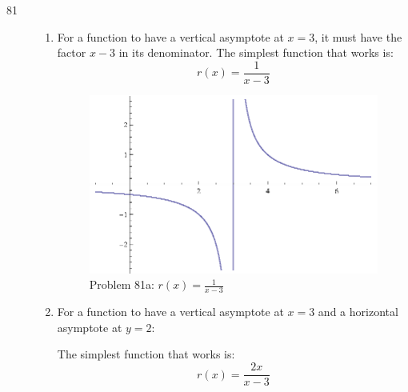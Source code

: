 \documentclass{exam}
\begin{document}
\begin{description}
    \pagebreak

    \item[81]
      \begin{enumerate}[a]
        \item 
          For a function to have a vertical asymptote at $x = 3$, it must have the factor $x - 3$ in its denominator.
          The simplest function that works is:
          \[
            r(x) = \frac{1}{x - 3}
          \]

          \begin{figure}[H]
            \centering
            \includegraphics{problem81a.eps}
            \caption*{Problem 81a: $r(x) = \frac{1}{x - 3}$}
          \end{figure}

        \pagebreak

        \item 
          For a function to have a vertical asymptote at $x = 3$ and a horizontal asymptote at $y = 2$:
          The simplest function that works is:
          \[
            r(x) = \frac{2x}{x - 3}
          \]


\end{enumerate}
\end{description}
\end{document}
